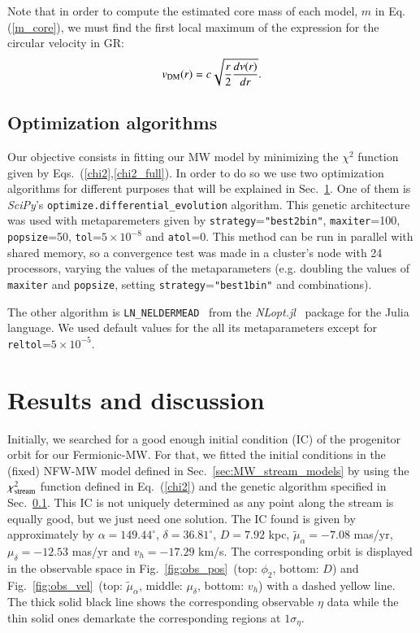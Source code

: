 \documentclass[twocolumn]{aa}
\begin{document}
Note that in order to compute the estimated core mass of each model, $m$ in Eq.(\ref{m_core}),
we must find the first local maximum of the expression for the circular velocity in GR:
\begin{equation}
   \label{v_circ_dm}
   v_{\rm{DM}}(r)= c\sqrt{\frac{r}{2}\frac{d\nu(r)}{dr}}.
\end{equation}

\subsection{Optimization algorithms}
\label{sec:optimization}

Our objective consists in fitting our MW model by minimizing the $\chi^2$ function given by Eqs.~(\ref{chi2},\ref{chi2_full}).  In order to do so we use two optimization algorithms for different purposes
that will be explained in Sec.~\ref{sec:results}.
One of them is {\it SciPy}'s
\texttt{optimize.differential\_evolution} algorithm. This genetic architecture
was used with metaparemeters given by
\texttt{strategy}=\texttt{"best2bin"}, \texttt{maxiter}=100, \texttt{popsize}=50,
\texttt{tol}=$5\times10^{-8}$ and \texttt{atol}=0. This method can be run in parallel with shared memory,
so a convergence test was made in a cluster's node with 24 processors, varying the values of the metaparameters (e.g. doubling the values of \texttt{maxiter} and \texttt{popsize}, setting \texttt{strategy}=\texttt{"best1bin"} and combinations).

The other algorithm is \texttt{LN\_NELDERMEAD}~\citep{NELDERMEAD,10.1093/comjnl/8.1.42,shere} from the
{\it NLopt.jl}~\citep{NLopt} package
for the {\sc Julia}~\citep{bezanson2017julia} language.
We used default values for the all its metaparameters except for
\texttt{reltol}=$5\times10^{-5}$.



\section{Results and discussion}
\label{sec:results}

Initially, we searched for a good enough initial condition (IC) of the progenitor orbit for our
Fermionic-MW. For that, we fitted the initial conditions in the (fixed) NFW-MW model defined in
Sec.~\ref{sec:MW_stream_models} by using the $\chi^2_{\rm{stream}}$ function defined in Eq.~(\ref{chi2})
and the genetic algorithm specified in Sec.~\ref{sec:optimization}. This IC is not uniquely
determined as any point along the stream is equally good, but we just need one solution. The IC
found is given by approximately by $\alpha=149.44^{\circ}$, $\delta=36.81^{\circ}$, $D=7.92$ kpc,
$\tilde{\mu}_\alpha=-7.08$ mas/yr, $\mu_\delta=-12.53$ mas/yr and $v_h=-17.29$ km/s.
The corresponding orbit is displayed in the observable space in Fig.~\ref{fig:obs_pos}~(top: $\phi_2$, bottom: $D$) and Fig.~\ref{fig:obs_vel}~(top: $\tilde{\mu}_\alpha$, middle: $\mu_\delta$, bottom: $v_h$)
with a dashed yellow line. The thick solid black line shows the corresponding observable $\eta$ data
while the thin solid ones demarkate the corresponding regions at $1\sigma_\eta$.
\end{document}
